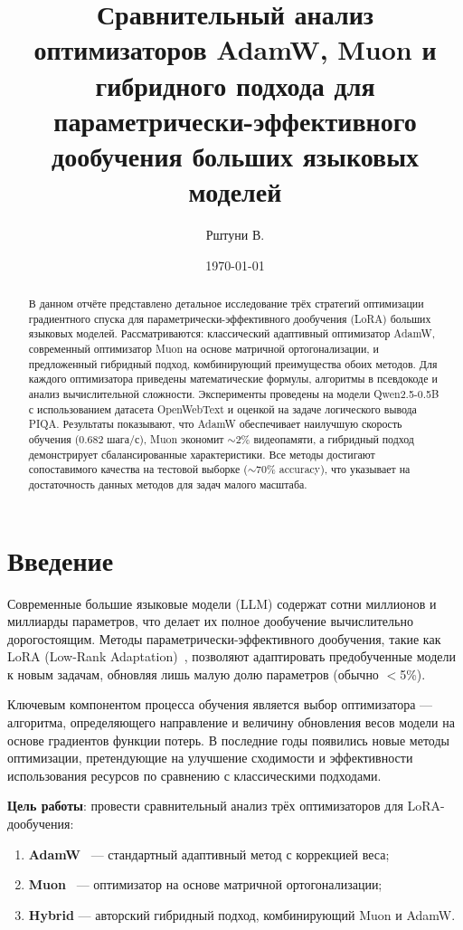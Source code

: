 \documentclass[a4paper,12pt]{article}
\title{Сравнительный анализ оптимизаторов AdamW, Muon и гибридного подхода для параметрически-эффективного дообучения больших языковых моделей}
\author{Рштуни В.}
\date{\today}
\begin{document}
\maketitle

\begin{abstract}
В данном отчёте представлено детальное исследование трёх стратегий оптимизации градиентного спуска для параметрически-эффективного дообучения (LoRA) больших языковых моделей. Рассматриваются: классический адаптивный оптимизатор AdamW, современный оптимизатор Muon на основе матричной ортогонализации, и предложенный гибридный подход, комбинирующий преимущества обоих методов. Для каждого оптимизатора приведены математические формулы, алгоритмы в псевдокоде и анализ вычислительной сложности. Эксперименты проведены на модели Qwen2.5-0.5B с использованием датасета OpenWebText и оценкой на задаче логического вывода PIQA. Результаты показывают, что AdamW обеспечивает наилучшую скорость обучения (0.682 шага/с), Muon экономит $\sim$2\% видеопамяти, а гибридный подход демонстрирует сбалансированные характеристики. Все методы достигают сопоставимого качества на тестовой выборке ($\sim$70\% accuracy), что указывает на достаточность данных методов для задач малого масштаба.
\end{abstract}
\newpage

\tableofcontents
\newpage

\section{Введение}
\label{sec:intro}

Современные большие языковые модели (LLM) содержат сотни миллионов и миллиарды параметров, что делает их полное дообучение вычислительно дорогостоящим. Методы параметрически-эффективного дообучения, такие как LoRA (Low-Rank Adaptation)~\cite{hu2021lora}, позволяют адаптировать предобученные модели к новым задачам, обновляя лишь малую долю параметров (обычно $<$5\%).

Ключевым компонентом процесса обучения является выбор оптимизатора --- алгоритма, определяющего направление и величину обновления весов модели на основе градиентов функции потерь. В последние годы появились новые методы оптимизации, претендующие на улучшение сходимости и эффективности использования ресурсов по сравнению с классическими подходами.

\textbf{Цель работы}: провести сравнительный анализ трёх оптимизаторов для LoRA-дообучения:
\begin{enumerate}
    \item \textbf{AdamW}~\cite{loshchilov2019adamw} --- стандартный адаптивный метод с коррекцией веса;
    \item \textbf{Muon}~\cite{moonshot2024muon} --- оптимизатор на основе матричной ортогонализации;
    \item \textbf{Hybrid} --- авторский гибридный подход, комбинирующий Muon и AdamW.
\end{enumerate}
\end{document}
